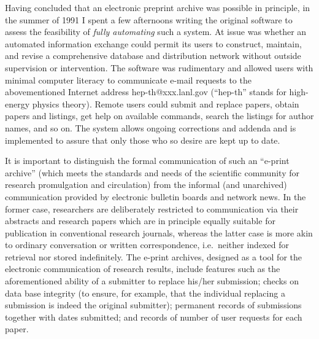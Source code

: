 \medskip{}

Having concluded that an electronic preprint archive was possible in principle,
in the summer of 1991 I spent a few afternoons writing the original software to
assess the feasibility of {\it fully automating\/} such a system. At issue was
whether an automated information exchange could permit its users to construct,
maintain, and revise a comprehensive database and distribution network without
outside supervision or intervention. The software was rudimentary and allowed
users with minimal computer literacy to communicate e-mail requests to the
abovementioned
Internet address hep-th@xxx.lanl.gov (``hep-th'' stands for high-energy physics
theory). Remote users could submit and replace papers, obtain papers and
listings, get help on available commands, search the listings for author names,
and so on. The system allows ongoing corrections and addenda and is implemented
to assure that only those who so desire are kept up to date.

It is important to distinguish the formal communication of such an ``e-print
archive'' (which meets the standards and needs of the scientific community for
research promulgation and circulation) from the informal (and unarchived)
communication provided by electronic bulletin boards and network news. In the
former case, researchers are deliberately restricted to communication via their
abstracts and research papers which are in principle equally suitable for
publication in conventional research journals, whereas the latter case is more
akin to ordinary conversation or written correspondence, i.e.\ neither indexed
for retrieval nor stored indefinitely. The e-print archives, designed as a tool
for the electronic communication of research results, include features such as
the aforementioned ability of a submitter to replace his/her submission; checks
on data base integrity (to ensure, for example, that the individual replacing a
submission is indeed the original submitter); permanent records of submissions
together with dates submitted; and records of number of user requests for each
paper.

